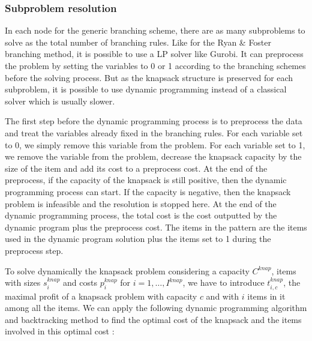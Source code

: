 \subsubsection{Subproblem resolution}
\label{generic_sp}

In each node for the generic branching scheme, there are as many subproblems to solve as the total number of branching rules. Like for the Ryan \& Foster branching method, it is possible to use a LP solver like Gurobi. It can preprocess the problem by setting the variables to 0 or 1 according to the branching schemes before the solving process. But as the knapsack structure is preserved for each subproblem, it is possible to use dynamic programming instead of a classical solver which is usually slower. 

The first step before the dynamic programming process is to preprocess the data and treat the variables already fixed in the branching rules. For each variable set to 0, we simply remove this variable from the problem. For each variable set to 1, we remove the variable from the problem, decrease the knapsack capacity by the size of the item and add its cost to a preprocess cost. At the end of the preprocess, if the capacity of the knapsack is still positive, then the dynamic programming process can start. If the capacity is negative, then the knapsack problem is infeasible and the resolution is stopped here. At the end of the dynamic programming process, the total cost is the cost outputted by the dynamic program plus the preprocess cost. The items in the pattern are the items used in the dynamic program solution plus the items set to 1 during the preprocess step.

To solve dynamically the knapsack problem considering a capacity $C^{knap}$, items with sizes $s_i^{knap}$ and costs $p_i^{knap}$ for $i=1,\dots, I^{knap}$, we have to introduce $t_{i,c}^{knap}$, the maximal profit of a knapsack problem with capacity $c$ and with $i$ items in it among all the items. We can apply the following dynamic programming algorithm and backtracking method to find the optimal cost of the knapsack and the items involved in this optimal cost : 

